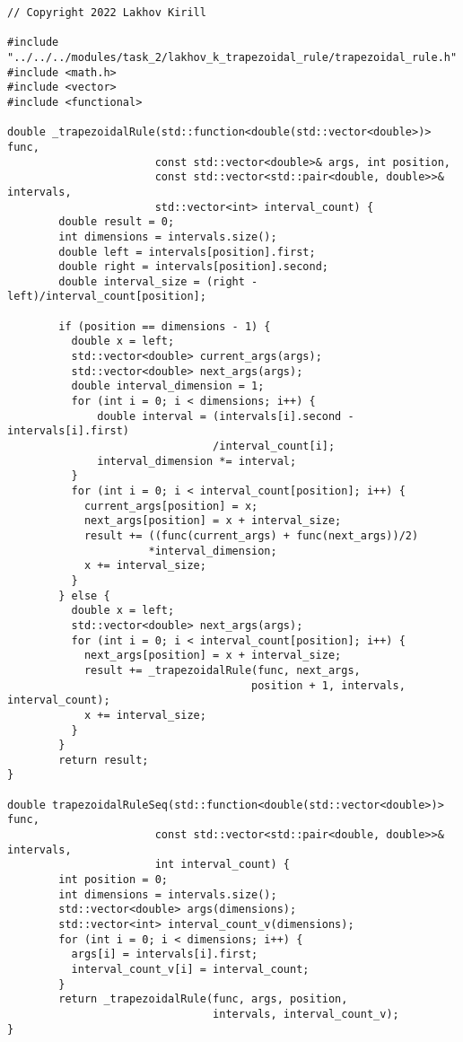 \documentclass{report}
\begin{document}
\begin{lstlisting}
// Copyright 2022 Lakhov Kirill

#include "../../../modules/task_2/lakhov_k_trapezoidal_rule/trapezoidal_rule.h"
#include <math.h>
#include <vector>
#include <functional>

double _trapezoidalRule(std::function<double(std::vector<double>)> func,
                       const std::vector<double>& args, int position,
                       const std::vector<std::pair<double, double>>& intervals,
                       std::vector<int> interval_count) {
        double result = 0;
        int dimensions = intervals.size();
        double left = intervals[position].first;
        double right = intervals[position].second;
        double interval_size = (right - left)/interval_count[position];

        if (position == dimensions - 1) {
          double x = left;
          std::vector<double> current_args(args);
          std::vector<double> next_args(args);
          double interval_dimension = 1;
          for (int i = 0; i < dimensions; i++) {
              double interval = (intervals[i].second - intervals[i].first)
                                /interval_count[i];
              interval_dimension *= interval;
          }
          for (int i = 0; i < interval_count[position]; i++) {
            current_args[position] = x;
            next_args[position] = x + interval_size;
            result += ((func(current_args) + func(next_args))/2)
                      *interval_dimension;
            x += interval_size;
          }
        } else {
          double x = left;
          std::vector<double> next_args(args);
          for (int i = 0; i < interval_count[position]; i++) {
            next_args[position] = x + interval_size;
            result += _trapezoidalRule(func, next_args,
                                      position + 1, intervals, interval_count);
            x += interval_size;
          }
        }
        return result;
}

double trapezoidalRuleSeq(std::function<double(std::vector<double>)> func,
                       const std::vector<std::pair<double, double>>& intervals,
                       int interval_count) {
        int position = 0;
        int dimensions = intervals.size();
        std::vector<double> args(dimensions);
        std::vector<int> interval_count_v(dimensions);
        for (int i = 0; i < dimensions; i++) {
          args[i] = intervals[i].first;
          interval_count_v[i] = interval_count;
        }
        return _trapezoidalRule(func, args, position,
                                intervals, interval_count_v);
}


\end{lstlisting}
\end{document}
